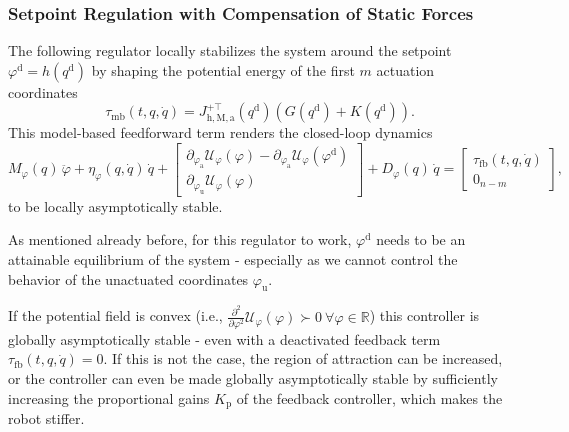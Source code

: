 \subsubsection{Setpoint Regulation with Compensation of Static Forces}
The following regulator locally stabilizes the system around the setpoint $\varphi^\mathrm{d} = h(q^\mathrm{d})$ by shaping the potential energy of the first $m$ actuation coordinates~\citep{borja2022energy, della2023model}
\begin{equation}\label{eq:background:model_based_control:potential_shaping_regulation}
    \tau_\mathrm{mb}(t, q, \dot{q}) = J_{\mathrm{h},\mathrm{M},\mathrm{a}}^{+\top}(q^\mathrm{d}) \left ( G(q^\mathrm{d}) + K(q^\mathrm{d}) \right ).
\end{equation}
This model-based feedforward term renders the closed-loop dynamics
\begin{equation}
    M_\varphi(q) \, \ddot{\varphi} + \eta_\varphi(q,\dot{q}) \, \dot{q} + \begin{bmatrix}
        \partial_{\varphi_\mathrm{a}} \mathcal{U}_\varphi(\varphi) - \partial_{\varphi_\mathrm{a}} \mathcal{U}_\varphi(\varphi^\mathrm{d})\\
        \partial_{\varphi_\mathrm{u}} \mathcal{U}_\varphi(\varphi)
    \end{bmatrix} + D_\varphi(q) \, \dot{q} = \begin{bmatrix}
        \tau_\mathrm{fb}(t, q, \dot{q})\\ 0_{n-m}
    \end{bmatrix},
\end{equation}
to be locally asymptotically stable.

As mentioned already before, for this regulator to work, $\varphi^\mathrm{d}$ needs to be an attainable equilibrium of the system - especially as we cannot control the behavior of the unactuated coordinates $\varphi_\mathrm{u}$. 

If the potential field is convex (i.e., $\frac{\partial^2}{\partial \varphi^2}  \mathcal{U}_\varphi(\varphi) \succ 0 \: \forall \varphi \in \mathbb{R}$) this controller is globally asymptotically stable - even with a deactivated feedback term $\tau_\mathrm{fb}(t,q,\dot{q})=0$. If this is not the case, the region of attraction can be increased, or the controller can even be made globally asymptotically stable by sufficiently increasing the proportional gains $K_\mathrm{p}$ of the feedback controller, which makes the robot stiffer.

